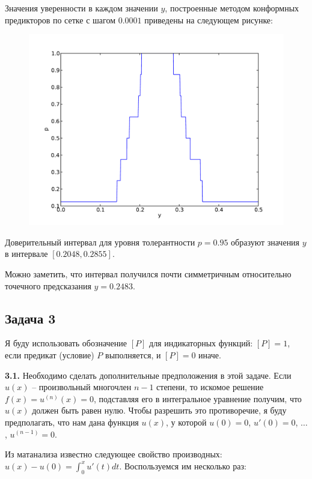 \documentclass[a4paper, 12pt, onepage]{article}
\begin{document}
Значения уверенности в каждом значении $y$, построенные методом конформных
предикторов по сетке с шагом $0.0001$ приведены на следующем рисунке:
\begin{figure}[h]
  \centering
  \includegraphics[scale=0.7]{figure2.pdf}
\end{figure}

Доверительный интервал для уровня толерантности $p=0.95$ образуют
значения $y$ в интервале $[0.2048, 0.2855]$.

Можно заметить, что интервал получился почти симметричным
относительно точечного предсказания $y=0.2483$.


\newpage
\subsection*{Задача 3}

Я буду использовать обозначение $[P]$ для индикаторных функций: $[P] = 1$, если предикат (условие) $P$ выполняется,
и $[P] = 0$ иначе.

\textbf{3.1.} Необходимо сделать дополнительные предположения в этой задаче.
Если $u(x)$ -- произвольный многочлен $n-1$ степени, то искомое решение $f(x) = u^{(n)}(x) = 0$,
подставляя его в интегральное уравнение получим, что $u(x)$ должен быть равен нулю.
Чтобы разрешить это противоречие, я буду предполагать, что нам дана
функция $u(x)$, у которой $u(0) = 0$, $u'(0) = 0$, $\ldots$, $u^{(n-1)} = 0$.

Из матанализа известно следующее свойство производных:
$u(x) - u(0) = \int_0^x u'(t) dt$. Воспользуемся им несколько раз:
\end{document}
